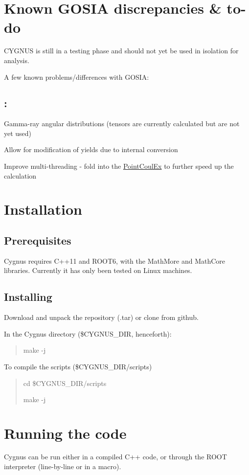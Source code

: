 \hypertarget{index_discrepancies}{}\section{Known G\-O\-S\-I\-A discrepancies \& to-\/do}\label{index_discrepancies}
C\-Y\-G\-N\-U\-S is still in a testing phase and should not yet be used in isolation for analysis.

A few known problems/differences with G\-O\-S\-I\-A\-:\hypertarget{index_To-do}{}\subsection{\-:}\label{index_To-do}
Gamma-\/ray angular distributions (tensors are currently calculated but are not yet used)

Allow for modification of yields due to internal conversion

Improve multi-\/threading -\/ fold into the \hyperlink{classPointCoulEx}{Point\-Coul\-Ex} to further speed up the calculation\hypertarget{index_install_sec}{}\section{Installation}\label{index_install_sec}
\hypertarget{index_prereq}{}\subsection{Prerequisites}\label{index_prereq}
Cygnus requires C++11 and R\-O\-O\-T6, with the Math\-More and Math\-Core libraries. Currently it has only been tested on Linux machines.\hypertarget{index_inst}{}\subsection{Installing}\label{index_inst}
Download and unpack the repository (.tar) or clone from github.

In the Cygnus directory (\$\-C\-Y\-G\-N\-U\-S\-\_\-\-D\-I\-R, henceforth)\-: \par
\begin{quotation}
make -\/j

\end{quotation}


To compile the scripts (\$\-C\-Y\-G\-N\-U\-S\-\_\-\-D\-I\-R/scripts) \begin{quotation}
cd \$\-C\-Y\-G\-N\-U\-S\-\_\-\-D\-I\-R/scripts \par
make -\/j

\end{quotation}
\hypertarget{index_running}{}\section{Running the code}\label{index_running}
Cygnus can be run either in a compiled C++ code, or through the R\-O\-O\-T interpreter (line-\/by-\/line or in a macro).

